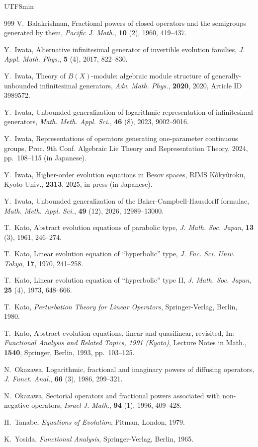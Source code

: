 \documentclass[10pt,a4paper]{article}
\theoremstyle{definition}
\theoremstyle{remark}
\begin{document}
\begin{CJK}{UTF8}{min}
\begin{thebibliography}{999}
V.~Balakrishnan, 
Fractional powers of closed operators and the semigroups generated by them, 
{\it Pacific J. Math.}, {\bf 10} (2), 1960, 419--437.

Y.~Iwata,
Alternative infinitesimal generator of invertible evolution families, 
{\it J. Appl. Math. Phys.}, {\bf 5} (4), 2017, 822--830.


Y.~Iwata, 
Theory of $B(X)$-module: algebraic module structure of generally-unbounded infinitesimal generators, 
{\it Adv. Math. Phys.}, {\bf 2020}, 2020, Article ID 3989572.

Y.~Iwata, 
Unbounded generalization of logarithmic representation of infinitesimal generators, 
{\it Math. Meth. Appl. Sci.}, {\bf 46} (8), 2023, 9002--9016.


Y.~Iwata, 
Representations of operators generating one-parameter continuous groups, 
Proc. 9th Conf. Algebraic Lie Theory and Representation Theory, 2024, pp.~108--115 (in Japanese).

Y.~Iwata, 
Higher-order evolution equations in Besov spaces, 
RIMS K\^oky\^uroku, Kyoto Univ., {\bf 2313}, 2025, in press (in Japanese).

Y.~Iwata,
Unbounded generalization of the Baker-Campbell-Hausdorff formulae,
{\it Math. Meth. Appl. Sci.}, {\bf 49} (12), 2026, 12989--13000.

T.~Kato, 
Abstract evolution equations of parabolic type, 
{\it J. Math. Soc. Japan}, {\bf 13} (3), 1961, 246--274.

T.~Kato, 
Linear evolution equation of ``hyperbolic'' type, 
{\it J. Fac. Sci. Univ. Tokyo}, {\bf 17}, 1970, 241--258.

T.~Kato, 
Linear evolution equation of ``hyperbolic'' type II, 
{\it J. Math. Soc. Japan}, {\bf 25} (4), 1973, 648--666.

T.~Kato, 
{\it Perturbation Theory for Linear Operators}, 
Springer-Verlag, Berlin, 1980.

T.~Kato, 
Abstract evolution equations, linear and quasilinear, revisited, 
In: {\it Functional Analysis and Related Topics, 1991 (Kyoto)}, 
Lecture Notes in Math., {\bf 1540}, Springer, Berlin, 1993, pp.~103--125.

N.~Okazawa, 
Logarithmic, fractional and imaginary powers of diffusing operators, 
{\it J. Funct. Anal.}, {\bf 66} (3), 1986, 299--321.

N.~Okazawa, 
Sectorial operators and fractional powers associated with non-negative operators, 
{\it Israel J. Math.}, {\bf 94} (1), 1996, 409--428.

H.~Tanabe, 
{\it Equations of Evolution}, 
Pitman, London, 1979.

K.~Yosida, 
{\it Functional Analysis}, 
Springer-Verlag, Berlin, 1965.

\end{thebibliography}
\end{CJK}
\end{document}

